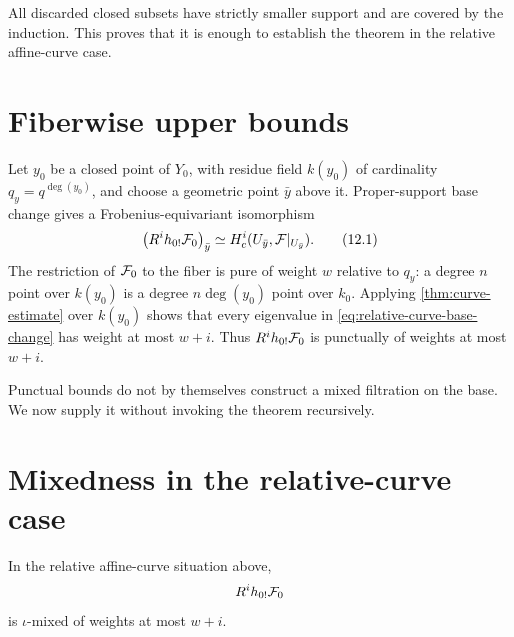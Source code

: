 All discarded closed subsets have strictly smaller support and are
covered by the induction.  This proves that it is enough to establish
the theorem in the relative affine-curve case.

\section{Fiberwise upper bounds}

Let \(y_0\) be a closed point of \(Y_0\), with residue field
\(k(y_0)\) of cardinality \(q_y=q^{\deg(y_0)}\), and choose a geometric
point \(\bar y\) above it.  Proper-support base change gives a
Frobenius-equivariant isomorphism
\[
  \left(R^ih_{0!}\mathcal F_0\right)_{\bar y}
  \simeq
  H_c^i(U_{\bar y},\mathcal F|_{U_{\bar y}}).
\tag{12.1}
\label{eq:relative-curve-base-change}
\]
The restriction of \(\mathcal F_0\) to the fiber is pure of weight \(w\)
relative to \(q_y\): a degree \(n\) point over \(k(y_0)\) is a degree
\(n\deg(y_0)\) point over \(k_0\).  Applying
\cref{thm:curve-estimate} over \(k(y_0)\) shows that every eigenvalue in
\eqref{eq:relative-curve-base-change} has weight at most \(w+i\).
Thus \(R^ih_{0!}\mathcal F_0\) is punctually of weights at most \(w+i\).

Punctual bounds do not by themselves construct a mixed filtration on
the base.  We now supply it without invoking the theorem recursively.

\section{Mixedness in the relative-curve case}

\begin{lemma}
\label{lem:relative-curve-mixedness}
In the relative affine-curve situation above,
\[
  R^ih_{0!}\mathcal F_0
\]
is \(\iota\)-mixed of weights at most \(w+i\).
\end{lemma}

